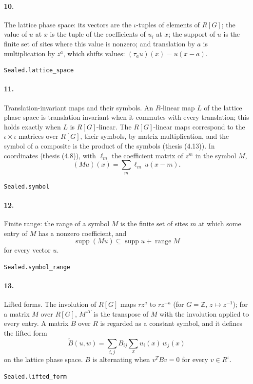 \documentclass[11pt]{article}
\begin{document}
\paragraph{10.} The lattice phase space: its vectors are the $\iota$-tuples of elements of $R[G]$; the value of $u$ at $x$ is the tuple of the coefficients of $u_i$ at $x$; the support of $u$ is the finite set of sites where this value is nonzero; and translation by $a$ is multiplication by $z^a$, which shifts values: $(\tau_a u)(x) = u(x - a)$.\par{\footnotesize\texttt{Sealed.lattice\_space}}

\paragraph{11.} Translation-invariant maps and their symbols. An $R$-linear map $L$ of the lattice phase space is translation invariant when it commutes with every translation; this holds exactly when $L$ is $R[G]$-linear. The $R[G]$-linear maps correspond to the $\iota \times \iota$ matrices over $R[G]$, their symbols, by matrix multiplication, and the symbol of a composite is the product of the symbols (thesis (4.13)). In coordinates (thesis (4.8)), with $\ell_m$ the coefficient matrix of $z^m$ in the symbol $M$, \[(M u)(x) = \sum_m \ell_m\, u(x - m).\]\par{\footnotesize\texttt{Sealed.symbol}}

\paragraph{12.} Finite range: the range of a symbol $M$ is the finite set of sites $m$ at which some entry of $M$ has a nonzero coefficient, and \[\operatorname{supp}(M u) \subseteq \operatorname{supp} u + \operatorname{range} M\] for every vector $u$.\par{\footnotesize\texttt{Sealed.symbol\_range}}

\paragraph{13.} Lifted forms. The involution of $R[G]$ maps $r z^a$ to $r z^{-a}$ (for $G = \mathbb Z$, $z \mapsto z^{-1}$); for a matrix $M$ over $R[G]$, $M^{\star T}$ is the transpose of $M$ with the involution applied to every entry. A matrix $B$ over $R$ is regarded as a constant symbol, and it defines the lifted form \[\tilde B(u, w) = \sum_{i, j} B_{ij} \sum_x u_i(x)\, w_j(x)\] on the lattice phase space. $B$ is alternating when $v^T B v = 0$ for every $v \in R^\iota$.\par{\footnotesize\texttt{Sealed.lifted\_form}}
\end{document}

